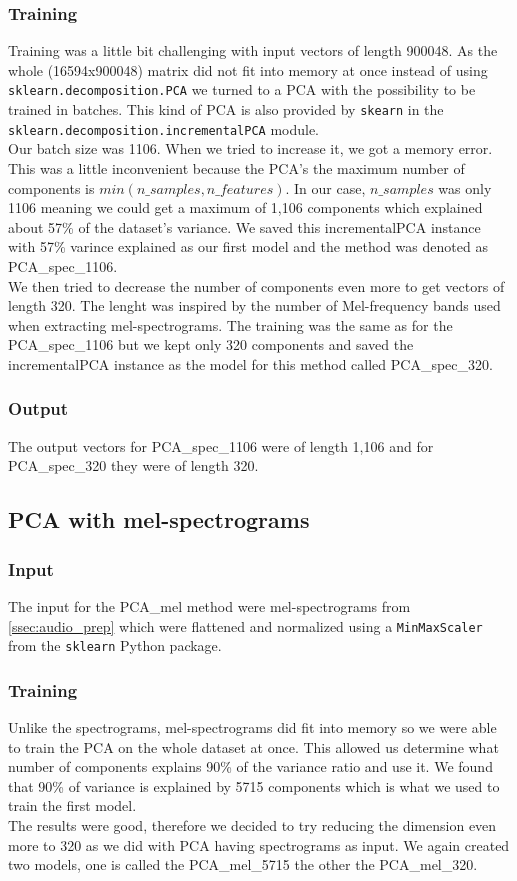 \subsubsection{Training}
Training was a little bit challenging with input vectors of length 900048. As the whole (16594x900048) matrix did not fit into memory at once instead of using \texttt{sklearn.decomposition.PCA} we turned to a PCA with the possibility to be trained in batches. This kind of PCA is also provided by \texttt{skearn} in the \texttt{sklearn.decomposition.incrementalPCA} module. \\ 
Our batch size was 1106. When we tried to increase it, we got a memory error. This was a little inconvenient because the PCA's the maximum number of components is $min(n\_samples, n\_features)$. In our case, $n\_samples$ was only 1106 meaning we could get a maximum of 1,106 components which explained about 57\% of the dataset's variance. We saved this incrementalPCA instance with 57\% varince explained as our first model and the method was denoted as PCA\_spec\_1106. \\
We then tried to decrease the number of components even more to get vectors of length 320. The lenght was inspired by the number of Mel-frequency bands used when extracting mel-spectrograms. The training was the same as for the PCA\_spec\_1106 but we kept only 320 components and saved the incrementalPCA instance as the model for this method called PCA\_spec\_320.

\subsubsection{Output}
The output vectors for PCA\_spec\_1106 were of length 1,106 and for PCA\_spec\_320 they were of length 320.

\subsection{PCA with mel-spectrograms}\label{ssec:pca_mel_experiments}
\subsubsection{Input}
The input for the PCA\_mel method were mel-spectrograms from \ref{ssec:audio_prep} which were flattened and normalized using a \texttt{MinMaxScaler} from the \texttt{sklearn} Python package.

\subsubsection{Training}
Unlike the spectrograms, mel-spectrograms did fit into memory so we were able to train the PCA on the whole dataset at once. This allowed us determine what number of components explains 90\% of the variance ratio and use it. We found that 90\% of variance is explained by 5715 components which is what we used to train the first model. \\
The results were good, therefore we decided to try reducing the dimension even more to 320 as we did with PCA having spectrograms as input. We again created two models, one is called the PCA\_mel\_5715 the other the PCA\_mel\_320. 

